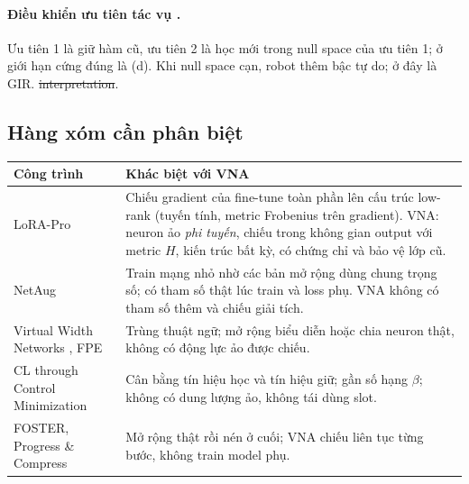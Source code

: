 \paragraph{Điều khiển ưu tiên tác vụ \cite{nakamura1987,siciliano1991,chiaverini1997}.} Ưu tiên 1 là giữ hàm cũ, ưu tiên 2 là học mới trong null space của ưu tiên 1; ở giới hạn cứng đúng là (d). Khi null space cạn, robot thêm bậc tự do; ở đây là GIR. \st{interpretation}.

\subsection{Hàng xóm cần phân biệt}

\begin{tabularx}{\linewidth}{@{}lX@{}}
\toprule
Công trình & Khác biệt với VNA \\
\midrule
LoRA-Pro \cite{wang2025lorapro} & Chiếu gradient của fine-tune toàn phần lên cấu trúc low-rank (tuyến tính, metric Frobenius trên gradient). VNA: neuron ảo \emph{phi tuyến}, chiếu trong không gian output với metric $H$, kiến trúc bất kỳ, có chứng chỉ và bảo vệ lớp cũ. \\
NetAug \cite{cai2022netaug} & Train mạng nhỏ nhờ các bản mở rộng dùng chung trọng số; có tham số thật lúc train và loss phụ. VNA không có tham số thêm và chiếu giải tích. \\
Virtual Width Networks \cite{vwn2025}, FPE \cite{fpe2025} & Trùng thuật ngữ; mở rộng biểu diễn hoặc chia neuron thật, không có động lực ảo được chiếu. \\
CL through Control Minimization \cite{dehaan2026control} & Cân bằng tín hiệu học và tín hiệu giữ; gần số hạng $\beta$; không có dung lượng ảo, không tái dùng slot. \\
FOSTER, Progress \& Compress & Mở rộng thật rồi nén ở cuối; VNA chiếu liên tục từng bước, không train model phụ. \\
\bottomrule
\end{tabularx}
